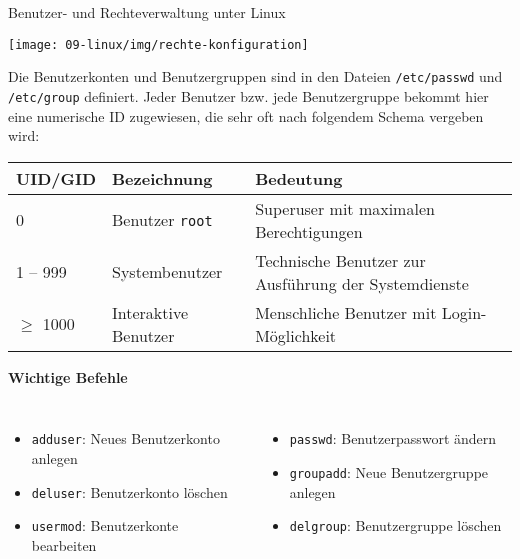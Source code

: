{\begin{frame}[allowframebreaks]{Benutzer- und Rechteverwaltung unter Linux}
    \framebreak

    \begin{center}
        \texttt{[image: 09-linux/img/rechte-konfiguration]}
    \end{center}

    \parbox{\linewidth}{
        Die Benutzerkonten und Benutzergruppen sind in den Dateien
        \texttt{/etc/passwd} und \texttt{/etc/group} definiert. Jeder
        Benutzer bzw. jede Benutzergruppe bekommt hier eine numerische ID
        zugewiesen, die sehr oft nach folgendem Schema vergeben wird:
    }

    \medskip

    {
        \scriptsize
        \renewcommand{\arraystretch}{1.4}
        \setlength{\tabcolsep}{0em}

        \begin{tabularx}{\textwidth}{p{} p{} X}
            \hline
            \textbf{UID/GID} & \textbf{Bezeichnung} & \textbf{Bedeutung} \\
            \hline

            0 & Benutzer \texttt{root} & Superuser mit maximalen Berechtigungen \\
            1 -- 999 & Systembenutzer & Technische Benutzer zur Ausführung der Systemdienste \\
            $\geq$ 1000 & Interaktive Benutzer & Menschliche Benutzer mit Login-Möglichkeit \\
            \hline
        \end{tabularx}
    }

    \medskip
    \textbf{Wichtige Befehle}
    {
        \setlength{\leftmargini}{1.2em}
        \begin{columns}[T, onlytextwidth]
            \begin{itemize}
                \item \texttt{adduser}: Neues Benutzerkonto anlegen
                \item \texttt{deluser}: Benutzerkonto löschen
                \item \texttt{usermod}: Benutzerkonte bearbeiten
            \end{itemize}

            \begin{itemize}
                \item \texttt{passwd}: Benutzerpasswort ändern
                \item \texttt{groupadd}: Neue Benutzergruppe anlegen
                \item \texttt{delgroup}: Benutzergruppe löschen
            \end{itemize}
        \end{columns}
    }
\end{frame}
}

